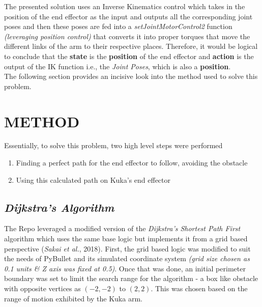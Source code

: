 \documentclass[a4paper]{article}
\begin{document}
The presented solution uses an Inverse Kinematics control which takes in the position of the end effector as the input and outputs all the corresponding joint poses and then these poses are fed into a {\it setJointMotorControl2} function {\it (leveraging position control)} that converts it into proper torques that move the different links of the arm to their respective places. Therefore, it would be logical to conclude that the \textbf{state} is the \textbf{position} of the end effector and \textbf{action} is the output of the IK function i.e., the {\it Joint Poses}, which is also a \textbf{position}.\\

The following section provides an incisive look into the method used to solve this problem.
\bigskip


\section{METHOD}
Essentially, to solve this problem, two high level steps were performed
\begin{enumerate}
    \item Finding a perfect path for the end effector to follow, avoiding the obstacle
    \item Using this calculated path on Kuka's end effector
\end{enumerate}

\subsection{\it \textbf{Dijkstra's Algorithm}}
The Repo leveraged a modified version of the {\it Dijkstra's Shortest Path First} algorithm which uses the same base logic but implements it from a grid based perspective ({\it Sakai et al.}, 2018). First, the grid based logic was modified to suit the needs of PyBullet and its simulated coordinate system {\it(grid size chosen as 0.1 units \& Z axis was fixed at 0.5)}. Once that was done, an initial perimeter boundary was set to limit the search range for the algorithm - a box like obstacle with opposite vertices as $(-2,-2)$ to $(2,2)$. This was chosen based on the range of motion exhibited by the Kuka arm.\\
\end{document}
